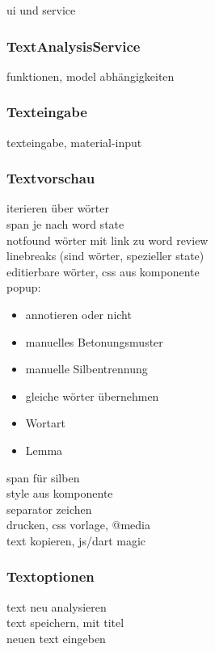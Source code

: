 ui und service

\subsubsection{TextAnalysisService}

funktionen, model abhängigkeiten

\subsubsection{Texteingabe}

texteingabe, material-input\\

\subsubsection{Textvorschau}

iterieren über wörter\\
span je nach word state\\
notfound wörter mit link zu word review\\
linebreaks (sind wörter, spezieller state)\\

editierbare wörter, css aus komponente\\
popup:\\
\begin{itemize}
	\item annotieren oder nicht
	\item manuelles Betonungsmuster
	\item manuelle Silbentrennung
	\item gleiche wörter übernehmen
	\item Wortart
	\item Lemma
\end{itemize}

span für silben\\
style aus komponente\\
separator zeichen\\

drucken, css vorlage, @media\\
text kopieren, js/dart magic\\

\subsubsection{Textoptionen}

text neu analysieren\\
text speichern, mit titel\\
neuen text eingeben

